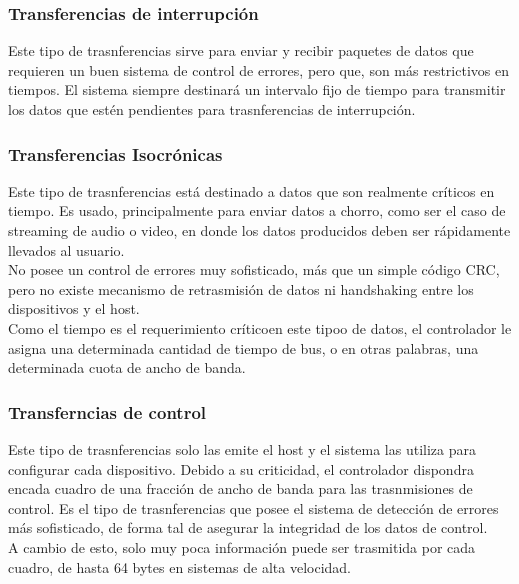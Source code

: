 	\subsubsection*{Transferencias de interrupción}
		Este tipo de trasnferencias sirve para enviar y recibir paquetes de datos que requieren un buen sistema de control de errores, pero que, son más restrictivos en tiempos. El sistema siempre destinará un intervalo fijo de tiempo para transmitir los datos que estén pendientes para trasnferencias de interrupción.\\
	
	\subsubsection*{Transferencias Isocrónicas}
		Este tipo de trasnferencias está destinado a datos que son realmente críticos en tiempo. Es usado, principalmente para enviar datos a chorro, como ser el caso de streaming de audio o video, en donde los datos producidos deben ser rápidamente llevados al usuario.\\
	
		No posee un control de errores muy sofisticado, más que un simple código CRC, pero no existe mecanismo de retrasmisión de datos ni handshaking entre los dispositivos y el host.\\
	
		Como el tiempo es el requerimiento críticoen este tipoo de datos, el controlador le asigna una determinada cantidad de tiempo de bus, o en otras palabras, una determinada cuota de ancho de banda.\\
	
	\subsubsection*{Transferncias de control}
		Este tipo de trasnferencias solo las emite el host y el sistema las utiliza para configurar cada dispositivo. Debido a su criticidad, el controlador dispondra encada cuadro de una fracción de ancho de banda para las trasnmisiones de control. Es el tipo de trasnferencias que posee el sistema de detección de errores más sofisticado, de forma tal de asegurar la integridad de los datos de control.\\
	
		A cambio de esto, solo muy poca información puede ser trasmitida por cada cuadro, de hasta 64 bytes en sistemas de alta velocidad.\\
	
